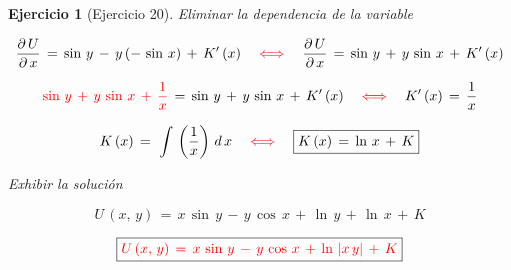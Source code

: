 \documentclass[a4paper,11pt]{book}
\newtheorem{ejer}{Ejercicio}[section]
\begin{document}
\begin{ejer}[Ejercicio 20]
 Eliminar la dependencia de la variable 

  

$$\dfrac{\partial\,U}{\partial\,x}\,=\,\sin\,y\,-\,y\,(-\,\sin\,x)\,+\,K'\,(x) \quad \textcolor{red}{\iff} \quad \dfrac{\partial\,U}{\partial\,x}\,=\,\sin\,y\,+\,y\,\sin\,x\,+\,K'\,(x)$$ 

  

$$\textcolor{red}{\sin\,y\,+\,y\,\sin\,x\,+\,\dfrac{1}{x}}\,=\,\sin\,y\,+\,y\,\sin\,x\,+\,K'\,(x) \quad \textcolor{red}{\iff} \quad K'\,(x)\,=\,\dfrac{1}{x}$$ 

  

$$K\,(x)\,=\,\displaystyle\,\int\,\left(\dfrac{1}{x} \right)\,d\,x \quad \textcolor{red}{\iff} \quad \boxed{K\,(x)\,=\,\ln\,x\,+\,K}$$ 

  

 Exhibir la solución  

  

$$U\,(x,\,y)\,=\,x\,\sin\,y\,-\,y\,\cos\,x\,+\,\ln\,y\,+\,\ln\,x\,+\,K$$ 

  

$$\boxed{\textcolor{red}{U\,(x,\,y)\,=\,x\,\sin\,y\,-\,y\,\cos\,x\,+\,\ln\,|x\,y|\,+\,K } }$$ 

\end{ejer} 

  
\end{document}
